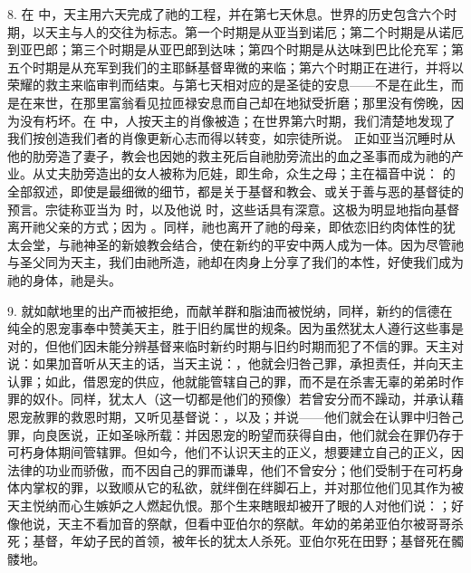 8. 在  中，天主用六天完成了祂的工程，并在第七天休息。世界的历史包含六个时期，以天主与人的交往为标志。第一个时期是从亚当到诺厄；第二个时期是从诺厄到亚巴郎；第三个时期是从亚巴郎到达味；第四个时期是从达味到巴比伦充军；第五个时期是从充军到我们的主耶稣基督卑微的来临；第六个时期正在进行，并将以荣耀的救主来临审判而结束。与第七天相对应的是圣徒的安息——不是在此生，而是在来世，在那里富翁看见拉匝禄安息而自己却在地狱受折磨；那里没有傍晚，因为没有朽坏。在  中，人按天主的肖像被造；在世界第六时期，我们清楚地发现了我们按创造我们者的肖像更新心志而得以转变，如宗徒所说。 正如亚当沉睡时从他的肋旁造了妻子，教会也因她的救主死后自祂肋旁流出的血之圣事而成为祂的产业。从丈夫肋旁造出的女人被称为厄娃，即生命，众生之母；主在福音中说：   的全部叙述，即使是最细微的细节，都是关于基督和教会、或关于善与恶的基督徒的预言。宗徒称亚当为  时，以及他说  时，这些话具有深意。这极为明显地指向基督离开祂父亲的方式；因为 。同样，祂也离开了祂的母亲，即依恋旧约肉体性的犹太会堂，与祂神圣的新娘教会结合，使在新约的平安中两人成为一体。因为尽管祂与圣父同为天主，我们由祂所造，祂却在肉身上分享了我们的本性，好使我们成为祂的身体，祂是头。\par

9. 就如献地里的出产而被拒绝，而献羊群和脂油而被悦纳，同样，新约的信德在纯全的恩宠事奉中赞美天主，胜于旧约属世的规条。因为虽然犹太人遵行这些事是对的，但他们因未能分辨基督来临时新约时期与旧约时期而犯了不信的罪。天主对说：如果加音听从天主的话，当天主说：，他就会归咎己罪，承担责任，并向天主认罪；如此，借恩宠的供应，他就能管辖自己的罪，而不是在杀害无辜的弟弟时作罪的奴仆。同样，犹太人（这一切都是他们的预像）若曾安分而不躁动，并承认藉恩宠赦罪的救恩时期，又听见基督说：，以及；并说——他们就会在认罪中归咎己罪，向良医说，正如圣咏所载：并因恩宠的盼望而获得自由，他们就会在罪仍存于可朽身体期间管辖罪。但如今，他们不认识天主的正义，想要建立自己的正义，因法律的功业而骄傲，而不因自己的罪而谦卑，他们不曾安分；他们受制于在可朽身体内掌权的罪，以致顺从它的私欲，就绊倒在绊脚石上，并对那位他们见其作为被天主悦纳而心生嫉妒之人燃起仇恨。那个生来瞎眼却被开了眼的人对他们说：；好像他说，天主不看加音的祭献，但看中亚伯尔的祭献。年幼的弟弟亚伯尔被哥哥杀死；基督，年幼子民的首领，被年长的犹太人杀死。亚伯尔死在田野；基督死在髑髅地。\par

